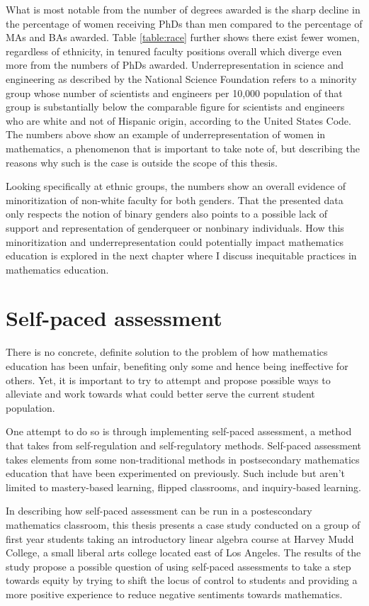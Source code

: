 What is most notable from the number of degrees awarded is the sharp decline in the percentage of women receiving PhDs than men compared to the percentage of MAs and BAs awarded. Table \ref{table:race} further shows there exist fewer women, regardless of ethnicity, in tenured faculty positions overall which diverge even more from the numbers of PhDs awarded. Underrepresentation in science and engineering as described by the National Science Foundation refers to a minority group whose number of scientists and engineers per 10,000 population of that group is substantially below the comparable figure for scientists and engineers who are white and not of Hispanic origin, according to the United States Code. The numbers above show an example of underrepresentation of women in mathematics, a phenomenon that is important to take note of, but describing the reasons why such is the case is outside the scope of this thesis.

Looking specifically at ethnic groups, the numbers show an overall evidence of minoritization of non-white faculty for both genders. That the presented data only respects the notion of binary genders also points to a possible lack of support and representation of genderqueer or nonbinary individuals. How this minoritization and underrepresentation could potentially impact mathematics education is explored in the next chapter where I discuss inequitable practices in mathematics education.

\section{Self-paced assessment}

There is no concrete, definite solution to the problem of how mathematics education has been unfair, benefiting only some and hence being ineffective for others. Yet, it is important to try to attempt and propose possible ways to alleviate and work towards what could better serve the current student population.

One attempt to do so is through implementing self-paced assessment, a method that takes from self-regulation and self-regulatory methods. Self-paced assessment takes elements from some non-traditional methods in postsecondary mathematics education that have been experimented on previously. Such include but aren't limited to mastery-based learning, flipped classrooms, and inquiry-based learning.

In describing how self-paced assessment can be run in a postescondary mathematics classroom, this thesis presents a case study conducted on a group of first year students taking an introductory linear algebra course at Harvey Mudd College, a small liberal arts college located east of Los Angeles. The results of the study propose a possible question of using self-paced assessments to take a step towards equity by trying to shift the locus of control to students and providing a more positive experience to reduce negative sentiments towards mathematics.
